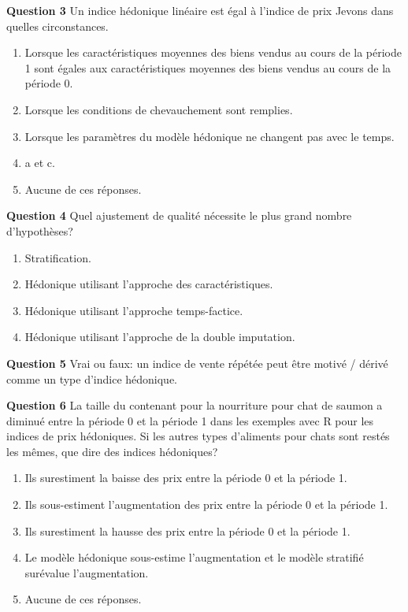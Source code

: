 \documentclass[]{article}
\begin{document}
\textbf{Question 3} Un indice hédonique linéaire est égal à l'indice de prix Jevons dans quelles circonstances.

\begin{enumerate}
\def\labelenumi{\alph{enumi})}
\item
  Lorsque les caractéristiques moyennes des biens vendus au cours de la période 1 sont égales aux caractéristiques moyennes des biens vendus au cours de la période 0.
\item
  Lorsque les conditions de chevauchement sont remplies.
\item
  Lorsque les paramètres du modèle hédonique ne changent pas avec le temps.
\item
  a et c.
\item
  Aucune de ces réponses.
\end{enumerate}

\textbf{Question 4} Quel ajustement de qualité nécessite le plus grand nombre d'hypothèses?

\begin{enumerate}
\def\labelenumi{\alph{enumi})}
\item
  Stratification.
\item
  Hédonique utilisant l'approche des caractéristiques.
\item
  Hédonique utilisant l'approche temps-factice.
\item
  Hédonique utilisant l'approche de la double imputation.
\end{enumerate}

\textbf{Question 5} Vrai ou faux: un indice de vente répétée peut être motivé / dérivé comme un type d'indice hédonique.

\textbf{Question 6} La taille du contenant pour la nourriture pour chat de saumon a diminué entre la période 0 et la période 1 dans les exemples avec R pour les indices de prix hédoniques. Si les autres types d'aliments pour chats sont restés les mêmes, que dire des indices hédoniques?

\begin{enumerate}
\def\labelenumi{\alph{enumi})}
\item
  Ils surestiment la baisse des prix entre la période 0 et la période 1.
\item
  Ils sous-estiment l'augmentation des prix entre la période 0 et la période 1.
\item
  Ils surestiment la hausse des prix entre la période 0 et la période 1.
\item
  Le modèle hédonique sous-estime l'augmentation et le modèle stratifié surévalue l'augmentation.
\item
  Aucune de ces réponses.
\end{enumerate}
\end{document}
